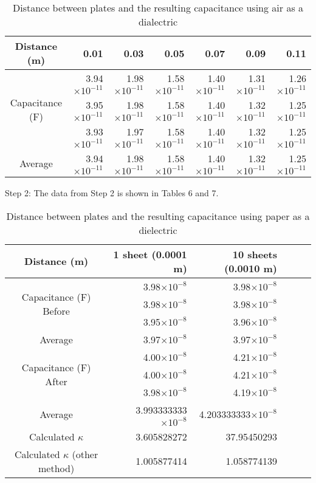 \documentclass [12pt, letterpaper, twoside] {article}
\begin{document}
\begin{table}[h!]
  \centering
  \begin{tabular}{| c | r | r | r | r | r | r |}
    \hline\hline
    Distance (m) & 0.01 & 0.03 & 0.05 & 0.07 & 0.09 & 0.11 \\
    \hline
    \multirow {3}{*}{Capacitance (F)} & 3.94\(\times10^{-11}\) & 1.98\(\times10^{-11}\) & 1.58\(\times10^{-11}\) & 1.40\(\times10^{-11}\) & 1.31\(\times10^{-11}\) & 1.26\(\times10^{-11}\) \\
    & 3.95\(\times10^{-11}\) & 1.98\(\times10^{-11}\) & 1.58\(\times10^{-11}\) & 1.40\(\times10^{-11}\) & 1.32\(\times10^{-11}\) & 1.25\(\times10^{-11}\) \\
    & 3.93\(\times10^{-11}\) & 1.97\(\times10^{-11}\) & 1.58\(\times10^{-11}\) & 1.40\(\times10^{-11}\) & 1.32\(\times10^{-11}\) & 1.25\(\times10^{-11}\) \\
    \hline
    Average & 3.94\(\times10^{-11}\) & 1.98\(\times10^{-11}\) & 1.58\(\times10^{-11}\) & 1.40\(\times10^{-11}\) & 1.32\(\times10^{-11}\) & 1.25\(\times10^{-11}\) \\ %
    \hline\hline
  \end{tabular}
  \caption{Distance between plates and the resulting capacitance using air as a dialectric}
\end{table}

\noindent
Step 2: The data from Step 2 is shown in Tables 6 and 7.
\begin{table}[h!]
  \centering
  \begin{tabular}{| c | r | r | r | r | r |}
    \hline\hline
    Distance (m) & 1 sheet (0.0001 m) & 10 sheets (0.0010 m) \\
    \hline
    \multirow {3}{*}{Capacitance (F) Before} & 3.98\(\times10^{-8}\) & 3.98\(\times10^{-8}\) \\
    & 3.98\(\times10^{-8}\) & 3.98\(\times10^{-8}\) \\
    & 3.95\(\times10^{-8}\) & 3.96\(\times10^{-8}\) \\
    \hline
    Average & 3.97\(\times10^{-8}\) & 3.97\(\times10^{-8}\) \\
    \hline
    \multirow {3}{*}{Capacitance (F) After} & 4.00\(\times10^{-8}\) & 4.21\(\times10^{-8}\) \\
    & 4.00\(\times10^{-8}\) & 4.21\(\times10^{-8}\) \\
    & 3.98\(\times10^{-8}\) & 4.19\(\times10^{-8}\) \\
    \hline
    Average & 3.993333333\(\times10^{-8}\) & 4.203333333\(\times10^{-8}\) \\
    \hline
    Calculated \(\kappa\) & 3.605828272 & 37.95450293 \\
    \hline
    Calculated \(\kappa\) (other method) & 1.005877414 & 1.058774139 \\
    \hline\hline
  \end{tabular}
  \caption{Distance between plates and the resulting capacitance using paper as a dielectric}
\end{table}
\end{document}
